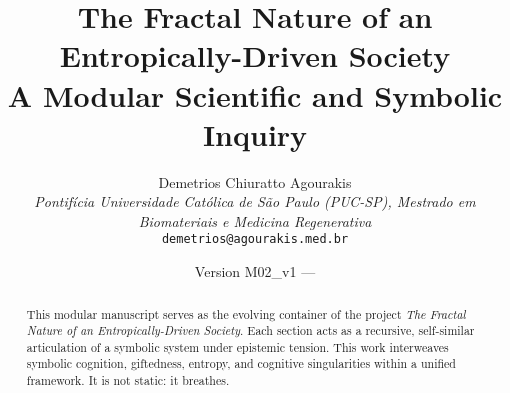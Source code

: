\documentclass[12pt]{article}
\title{\textbf{The Fractal Nature of an Entropically-Driven Society} \\ \large A Modular Scientific and Symbolic Inquiry}
\author{
Demetrios Chiuratto Agourakis\\
\textit{Pontifícia Universidade Católica de São Paulo (PUC-SP), Mestrado em Biomateriais e Medicina Regenerativa}\\
\texttt{demetrios@agourakis.med.br}
}
\date{Version M02\_v1 — \DTMnow}
\begin{document}
\maketitle


\begin{abstract}
This modular manuscript serves as the evolving container of the project \textit{The Fractal Nature of an Entropically-Driven Society}. Each section acts as a recursive, self-similar articulation of a symbolic system under epistemic tension. This work interweaves symbolic cognition, giftedness, entropy, and cognitive singularities within a unified framework. It is not static: it breathes.
\end{abstract}

\tableofcontents
\newpage




% 
% 
% 
% 



\end{document}
